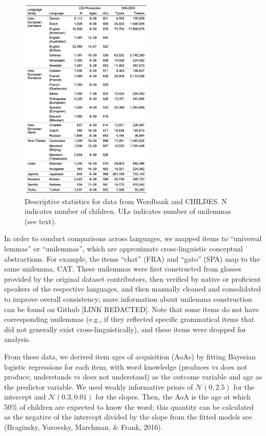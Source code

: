 \documentclass[10pt, letterpaper]{article}
\newenvironment{CodeChunk}{}{}
\begin{document}
\begin{CodeChunk}
\begin{figure}[ht]

{\centering \includegraphics[width=240px]{figs/descriptives} 

}

\caption[Descriptive statistics for data from Wordbank and CHILDES]{Descriptive statistics for data from Wordbank and CHILDES. N indicates number of children. ULs indicates number of unilemmas (see text).}\label{fig:descriptives}
\end{figure}
\end{CodeChunk}

In order to conduct comparisons across languages, we mapped items to
``universal lemmas'' or ``unilemmas'', which are approximate
cross-linguistic conceptual abstractions. For example, the items
``chat'' (FRA) and ``gato'' (SPA) map to the same unilemma, CAT. These
unilemmas were first constructed from glosses provided by the original
dataset contributors, then verified by native or proficient speakers of
the respective languages, and then manually cleaned and consolidated to
improve overall consistency; more information about unilemma
construction can be found on Github {[}LINK REDACTED{]}. Note that some
items do not have corresponding unilemmas (e.g., if they reflected
specific grammatical items that did not generally exist
cross-linguistically), and these items were dropped for analysis.

From these data, we derived item ages of acquisition (AoAs) by fitting
Bayesian logistic regressions for each item, with word knowledge
(produces vs does not produce; understands vs does not understand) as
the outcome variable and age as the predictor variable. We used weakly
informative priors of \(\mathcal{N}(0, 2.5)\) for the intercept and
\(\mathcal{N}(0.3, 0.01)\) for the slopes. Then, the AoA is the age at
which 50\% of children are expected to know the word; this quantity can
be calculated as the negative of the intercept divided by the slope from
the fitted models see (Braginsky, Yurovsky, Marchman, \& Frank, 2016).
\end{document}
